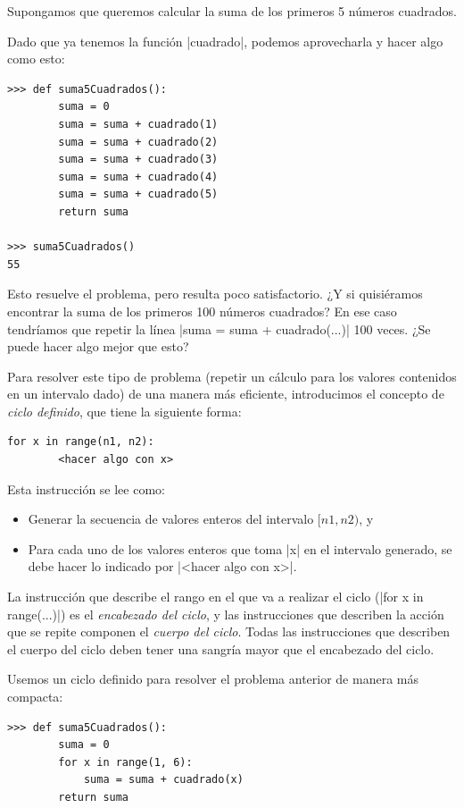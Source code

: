 \begin{problema}
Supongamos que queremos calcular la suma de los primeros 5 números cuadrados.

\begin{solucion}
Dado que ya tenemos la función |cuadrado|, podemos aprovecharla y hacer algo
como esto:

\begin{lstlisting}[numbers=none]
>>> def suma5Cuadrados():
        suma = 0
        suma = suma + cuadrado(1)
        suma = suma + cuadrado(2)
        suma = suma + cuadrado(3)
        suma = suma + cuadrado(4)
        suma = suma + cuadrado(5)
        return suma

>>> suma5Cuadrados()
55
\end{lstlisting}
\end{solucion}

Esto resuelve el problema, pero resulta poco satisfactorio. ¿Y si quisiéramos
encontrar la suma de los primeros 100 números cuadrados? En ese caso tendríamos
que repetir la línea |suma = suma + cuadrado(...)| 100 veces. ¿Se puede hacer
algo mejor que esto?

Para resolver este tipo de problema (repetir un cálculo para los valores
contenidos en un intervalo dado) de una manera más eficiente, introducimos el
concepto de {\it ciclo definido}, que tiene la siguiente forma:

\begin{lstlisting}[numbers=none]
for x in range(n1, n2):
        <hacer algo con x>
\end{lstlisting}

Esta instrucción se lee como:

\begin{itemize}
\item Generar la secuencia de valores enteros del intervalo $[n1, n2)$, y
\item Para cada uno de los valores enteros que toma |x| en el intervalo generado,
se debe hacer lo indicado por |<hacer algo con x>|.
\end{itemize}

La instrucción que describe el rango en el que va a realizar el ciclo
(|for x in range(...)|) es el {\it encabezado del ciclo}, y las instrucciones
que describen la acción que se repite componen el {\it cuerpo del ciclo}.
Todas las instrucciones que describen el cuerpo del ciclo deben tener una
sangría mayor que el encabezado del ciclo.

\begin{solucion}
Usemos un ciclo definido para resolver el problema anterior de manera más
compacta:

\begin{lstlisting}[numbers=none]
>>> def suma5Cuadrados():
        suma = 0
        for x in range(1, 6):
            suma = suma + cuadrado(x)
        return suma
\end{lstlisting}
\end{solucion}
\end{problema}


